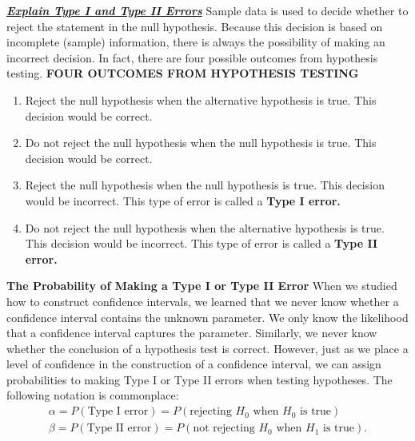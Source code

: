 \documentclass{report}
\begin{document}
    \pagebreak \bigbreak \noindent 
    \textbf{\textit{\underline{Explain Type I and Type II Errors}}}
    \bigbreak \noindent 
    Sample data is used to decide whether to reject the statement in the null hypothesis. Because this decision is based on incomplete (sample) information, there is always the possibility of making an incorrect decision. In fact, there are four possible outcomes from hypothesis testing.
    \bigbreak \noindent 
    \textbf{FOUR OUTCOMES FROM HYPOTHESIS TESTING}
    \begin{enumerate}
        \item Reject the null hypothesis when the alternative hypothesis is true. This decision would be correct.
        \item Do not reject the null hypothesis when the null hypothesis is true. This decision would be correct.
        \item Reject the null hypothesis when the null hypothesis is true. This decision would be incorrect. This type of error is called a \textbf{Type I error.}
        \item Do not reject the null hypothesis when the alternative hypothesis is true. This decision would be incorrect. This type of error is called a \textbf{Type II error.}
    \end{enumerate}
    \bigbreak \noindent 
    \bigbreak \noindent 
    \textbf{The Probability of Making a Type I or Type II Error}
    \bigbreak \noindent 
    When we studied how to construct confidence intervals, we learned that we never know whether a confidence interval contains the unknown parameter. We only know the likelihood that a confidence interval captures the parameter. Similarly, we never know whether the conclusion of a hypothesis test is correct. However, just as we place a level of confidence in the construction of a confidence interval, we can assign probabilities to making Type I or Type II errors when testing hypotheses. The following notation is commonplace:
    \begin{align*}
        \alpha = P(\text{Type I error}) = P(\text{rejecting } H_0 \text{ when } H_0 \text{ is true}) \\
        \beta = P(\text{Type II error}) = P(\text{not rejecting } H_0 \text{ when } H_1 \text{ is true})
    .\end{align*}
\end{document}
